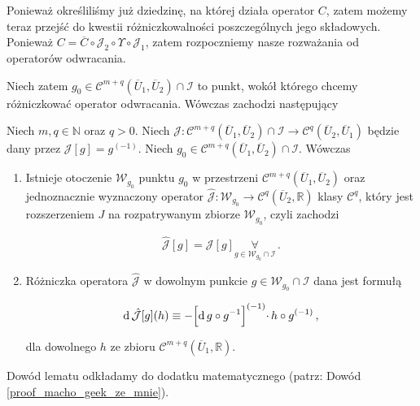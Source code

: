 Ponieważ określiliśmy już dziedzinę, na której działa operator $C$, zatem możemy teraz przejść do kwestii różniczkowalności poszczególnych jego składowych. Ponieważ $C = \overline{C} \circ \mathcal{J}_2 \circ \Upsilon \circ \mathcal{J}_1$, zatem rozpoczniemy nasze rozważania od operatorów odwracania.

Niech zatem $g_0 \in \mathcal{C}^{m+q}(\overline{U}_1,\overline{U}_2)\cap \mathcal{I}$ to punkt, wokół którego chcemy różniczkować operator odwracania. Wówczas zachodzi następujący

 
\begin{lemat}\label{macho_geek_ze_mnie}
 	Niech $m, q \in \mathbb{N}$ oraz $q > 0$. Niech $\mathcal{J}: \mathcal{C}^{m+q}(\overline{U}_1, \overline{U}_2) \cap \mathcal{I} \rightarrow \mathcal{C}^{q}(\overline{U}_2,\overline{U}_1)$ będzie dany przez $\mathcal{J}[g] = g^{(-1)}$. Niech $g_0 \in \mathcal{C}^{m+q}(\overline{U}_1, \overline{U}_2)\cap \mathcal{I}$. Wówczas 
\begin{enumerate}

\item{Istnieje otoczenie $\mathcal{W}_{g_0}$ punktu $g_0$ w przestrzeni $\mathcal{C}^{m+q}(\overline{U}_1, \overline{U}_2)$ oraz jednoznacznie wyznaczony operator $\hat{\mathcal{J}}: \mathcal{W}_{g_0} \rightarrow \mathcal{C}^{q}(\overline{U}_2, \mathbb{R})$ klasy $\mathcal{C}^{q}$, który jest rozszerzeniem $J$ na rozpatrywanym zbiorze $\mathcal{W}_{g_0}$, czyli zachodzi
 	
\begin{equation*}
	\hat{\mathcal{J}}[g] = \mathcal{J}[g] \underset{g \in \mathcal{W}_{g_0} \cap \mathcal{I}}{\forall}\,.	
\end{equation*} 	
	}
\item{Różniczka operatora $\hat{\mathcal{J}}$ w dowolnym punkcie $g \in \mathcal{W}_{g_0} \cap \mathcal{I}$ dana jest formułą

\begin{equation*}
	\mathrm{d}\, \hat{\mathcal{J}}[g](h) \equiv - \Bigl[ \mathrm{d}\, g \circ g^{-1} \Bigl]^{(-1)} \cdot \, h \circ g^{(-1)} \,,
\end{equation*} 	

dla dowolnego $h$ ze zbioru $\mathcal{C}^{m+q}(\overline{U}_1, \mathbb{R})$.
	}
\end{enumerate} 	
\end{lemat}

Dowód lematu odkładamy do dodatku matematycznego (patrz: Dowód \ref{proof_macho_geek_ze_mnie}). 


